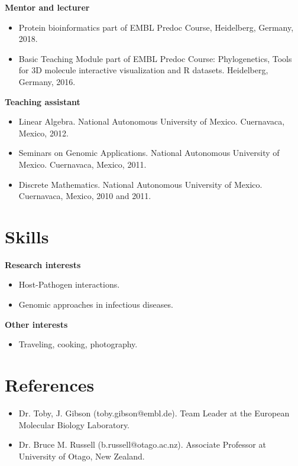 \documentclass[11pt,a4paper,sans]{moderncv} %
\begin{document}
\vspace{.1cm}
\textbf{Mentor and lecturer}
\begin{itemize}
\item Protein bioinformatics part of EMBL Predoc Course, Heidelberg, Germany, 2018.
\item Basic Teaching Module part of EMBL Predoc Course: Phylogenetics, Tools for 3D molecule interactive visualization and R datasets. Heidelberg, Germany, 2016.
\end{itemize}
\vspace{.1cm}
\textbf{Teaching assistant}
\begin{itemize}
\item Linear Algebra. National Autonomous University of Mexico. Cuernavaca, Mexico, 2012.
\item Seminars on Genomic Applications. National Autonomous University of Mexico. Cuernavaca, Mexico, 2011.
\item Discrete Mathematics. National Autonomous University of Mexico. Cuernavaca, Mexico, 2010 and 2011.
\end{itemize}

\section{Skills}
\vspace{.1cm}
\textbf{Research interests}
\begin{itemize}
\item Host-Pathogen interactions.
\item Genomic approaches in infectious diseases.
\end{itemize}
\textbf{Other interests}
\begin{itemize}
\item Traveling, cooking, photography.
\end{itemize}

\section{References}
\begin{itemize}
\item Dr. Toby, J. Gibson (toby.gibson@embl.de).
Team Leader at the European Molecular Biology Laboratory.
\item Dr. Bruce M. Russell (b.russell@otago.ac.nz).
Associate Professor at University of Otago, New Zealand.
\end{itemize}
\end{document}
